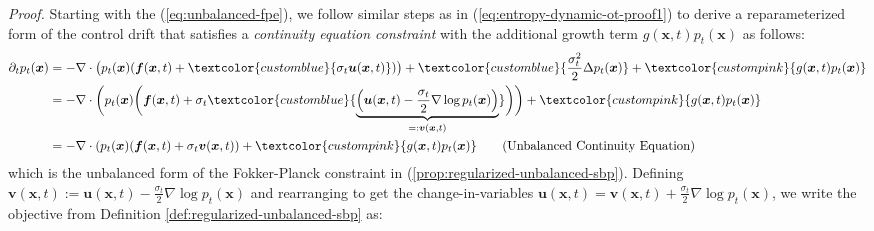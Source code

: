 \documentclass{article}
\newcommand{\bluetext}[1]{\textcolor{customblue}{#1}}
\newcommand{\pinktext}[1]{\textcolor{custompink}{#1}}
\begin{document}
\textit{Proof.} Starting with the (\ref{eq:unbalanced-fpe}), we follow similar steps as in (\ref{eq:entropy-dynamic-ot-proof1}) to derive a reparameterized form of the control drift that satisfies a \textit{continuity equation constraint} with the additional growth term $g(\boldsymbol{x},t)p_t(\boldsymbol{x})$ as follows:
\begin{align}
    \partial_tp_t(\boldsymbol{x})&=-\nabla\cdot\big(p_t(\boldsymbol{x})(\boldsymbol{f}(\boldsymbol{x},t) +\bluetext{\sigma_t\boldsymbol{u}(\boldsymbol{x},t)})\big)+\bluetext{\frac{\sigma_t^2}{2}\Delta p_t(\boldsymbol{x})}+\pinktext{g(\boldsymbol{x},t)p_t(\boldsymbol{x})}\nonumber\\
    &=-\nabla\cdot\bigg(p_t(\boldsymbol{x})\bigg(\boldsymbol{f}(\boldsymbol{x},t) +\sigma_t\bluetext{\underbrace{\left(\boldsymbol{u}(\boldsymbol{x},t)-\frac{\sigma_t}{2}\nabla \log p_t(\boldsymbol{x})\right)}_{=:\boldsymbol{v}(\boldsymbol{x},t)}}\bigg)\bigg)+\pinktext{g(\boldsymbol{x},t)p_t(\boldsymbol{x})}\nonumber\\
    &=-\nabla\cdot(p_t(\boldsymbol{x})(\boldsymbol{f}(\boldsymbol{x},t)+\sigma_t\boldsymbol{v}(\boldsymbol{x},t))+\pinktext{g(\boldsymbol{x},t)p_t(\boldsymbol{x})}\tag{Unbalanced Continuity Equation}
\end{align}
which is the unbalanced form of the Fokker-Planck constraint in (\ref{prop:regularized-unbalanced-sbp}). Defining $\boldsymbol{v}(\boldsymbol{x},t):=\boldsymbol{u}(\boldsymbol{x},t)-\frac{\sigma_t}{2}\nabla \log p_t(\boldsymbol{x})$ and rearranging to get the change-in-variables $\boldsymbol{u}(\boldsymbol{x},t)=\boldsymbol{v}(\boldsymbol{x},t)+\frac{\sigma_t}{2}\nabla \log  p_t(\boldsymbol{x})$, we write the objective from Definition \ref{def:regularized-unbalanced-sbp} as:\label{connection back to ot formulation}
\end{document}
